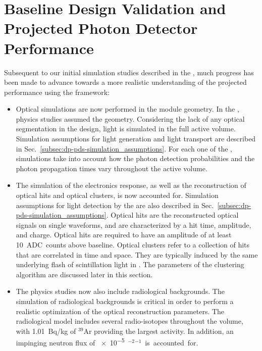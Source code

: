 \section{Baseline Design Validation and Projected Photon Detector Performance}
\label{sec:dp-pds-performance}

Subsequent to our initial simulation studies described in the  \cite{Abi:2018rgm}, much progress has been made to advance towards a more realistic understanding of the projected  performance using the  framework:
%
\begin{itemize}
\item Optical simulations are now performed in the   module geometry. In the  , physics studies assumed the  geometry. Considering the lack of any optical segmentation in the  design, light is simulated in the full \dpactivelarmass {} active volume. Simulation assumptions for light generation and light transport are described in Sec.~\ref{subsec:dp-pds-simulation_assumptions}. For each one of the \dpnumpmtch {}, simulations take into account how the photon detection probabilities and the photon propagation times vary throughout the  active volume.
%
\item The simulation of the electronics response, as well as the reconstruction of optical hits and optical clusters, is now accounted for. Simulation assumptions for light detection by the  are also described in Sec.~\ref{subsec:dp-pds-simulation_assumptions}. Optical hits are the reconstructed optical signals on single  waveforms, and are characterized by a hit time, amplitude, and charge. Optical hits are required to have an amplitude of at least \SI{10}{ADC counts} above baseline. Optical clusters refer to a collection of  hits that are correlated in time and space. They are typically induced by the same underlying flash of scintillation light in \lar. The parameters of the clustering algorithm are discussed later in this section.


%
\item The physics studies now also include radiological backgrounds. The simulation of radiological backgrounds is critical in order to perform a realistic optimization of the optical reconstruction parameters. The radiological model includes several radio-isotopes throughout the \lar volume, with \SI{1.01}{\becquerel/\kg} of $^{39}$Ar providing the largest activity. In addition, an impinging neutron flux of \SI{e-5}{\cm$^{-2}$\s$^{-1}$} is accounted for.
\end{itemize} 


